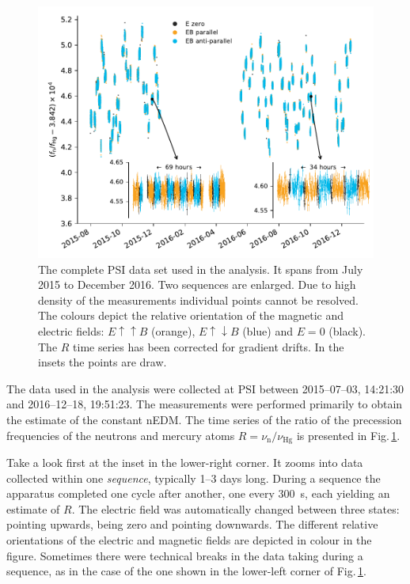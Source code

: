 
\begin{figure}
  \centering
  \includegraphics[width=\linewidth]{gfx/axions/deltah4mm_time_domain_inset_no_yerr.pdf}
  \caption{The complete PSI data set used in the analysis. It spans from July 2015 to December 2016. Two sequences are enlarged. Due to high density of the measurements individual points cannot be resolved. The colours depict the relative orientation of the magnetic and electric fields: $E \uparrow \uparrow B$ (orange), $E \uparrow \downarrow B$ (blue) and $E=0$ (black). The $R$ time series has been corrected for gradient drifts. In the insets the points are draw.}\label{fig:PSI_dataset_time_domain}
\end{figure}

The data used in the analysis were collected at PSI between 2015--07--03, 14:21:30 and 2016--12--18, 19:51:23. The measurements were performed primarily to obtain the estimate of the constant nEDM\@. The time series of the ratio of the precession frequencies of the neutrons and mercury atoms $R = \nu_\text{n} / \nu_\text{Hg}$ is presented in Fig.\,\ref{fig:PSI_dataset_time_domain}.

Take a look first at the inset in the lower-right corner. It zooms into data collected within one \emph{sequence}, typically 1--3 days long.
During a sequence the apparatus completed one cycle after another, one every \SI{300}{\second}, each yielding an estimate of $R$.
The electric field was automatically changed between three states: pointing upwards, being zero and pointing downwards. The different relative orientations of the electric and magnetic fields are depicted in colour in the figure. Sometimes there were technical breaks in the data taking during a sequence, as in the case of the one shown in the lower-left corner of Fig.\,\ref{fig:PSI_dataset_time_domain}.

